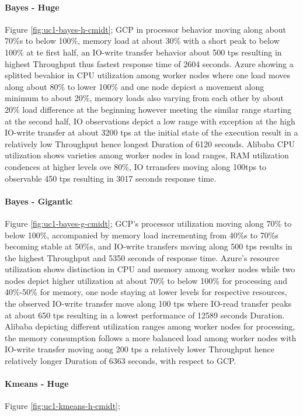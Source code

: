 \documentclass[review]{elsarticle}
\begin{document}
\paragraph{Bayes - Huge} Figure \ref{fig:uc1-bayes-h-cmidt}; GCP in processor behavior moving along about 70\%s to below 100\%, memory load at about 30\% with a short peak to below 100\% at te first half, an IO-write transfer behavior about 500 tps resulting in highest Throughput thus fastest response time of 2604 seconds. Azure showing a splitted bevahior in CPU utilization among worker nodes where one load moves along about 80\% to lower 100\% and one node depicst a movement along minimum to about 20\%, memory loads also varying from each other by about 20\% load difference at the beginning however meeting the similar range starting at the second half, IO observations depict a low range with exception at the high IO-write transfer at about 3200 tps at the initial state of the execution result in a relatively low Throughput hence longest Duration of 6120 seconds. Alibaba CPU utilization shows varieties among worker nodes in load ranges, RAM utilization condences at higher levels ove 80\%, IO trransfers moving along 100tps to observable 450 tps resulting in 3017 seconds response time.

\paragraph{Bayes - Gigantic} Figure \ref{fig:uc1-bayes-g-cmidt}; GCP's processor utilization moving along 70\% to below 100\%, accompanied by memory load incrementing from 40\%s to 70\%s becoming stable at 50\%s, and IO-write transfers moving along 500 tps results in the highest Throughput and 5350 seconds of response time. Azure's resource utilization shows distinction in CPU and memory among worker nodes while two nodes depict higher utilization at about 70\% to below 100\% for processing and 40\%-50\% for memory, one node staying at lower levels for respective resources, the observed IO-write transfer move along 100 tps where IO-read transfer peaks at about 650 tps resulting in a lowest performance of 12589 seconds Duration. Alibaba depicting different utilization ranges among worker nodes for processing, the memory consumption follows a more balanced load among worker nodes with IO-write transfer  moving aong 200 tps a relatively lower Throughput hence relatively longer Duration of 6363 seconds, with respect to GCP.

\paragraph{Kmeans - Huge} Figure \ref{fig:uc1-kmeans-h-cmidt};
\end{document}
